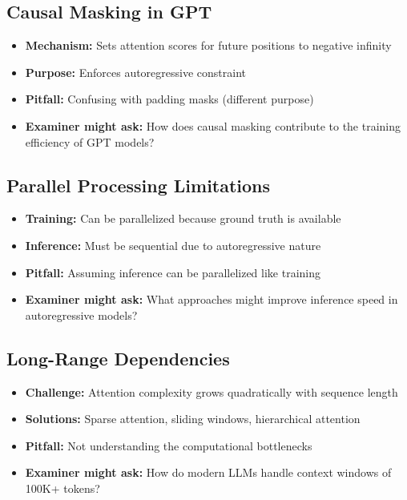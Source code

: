 \subsection*{Causal Masking in GPT}
\begin{itemize}
    \item \textbf{Mechanism:} Sets attention scores for future positions to negative infinity
    \item \textbf{Purpose:} Enforces autoregressive constraint
    \item \textbf{Pitfall:} Confusing with padding masks (different purpose)
    \item \textbf{Examiner might ask:} How does causal masking contribute to the training efficiency of GPT models?
\end{itemize}

\subsection*{Parallel Processing Limitations}
\begin{itemize}
    \item \textbf{Training:} Can be parallelized because ground truth is available
    \item \textbf{Inference:} Must be sequential due to autoregressive nature
    \item \textbf{Pitfall:} Assuming inference can be parallelized like training
    \item \textbf{Examiner might ask:} What approaches might improve inference speed in autoregressive models?
\end{itemize}

\subsection*{Long-Range Dependencies}
\begin{itemize}
    \item \textbf{Challenge:} Attention complexity grows quadratically with sequence length
    \item \textbf{Solutions:} Sparse attention, sliding windows, hierarchical attention
    \item \textbf{Pitfall:} Not understanding the computational bottlenecks
    \item \textbf{Examiner might ask:} How do modern LLMs handle context windows of 100K+ tokens?
\end{itemize}

